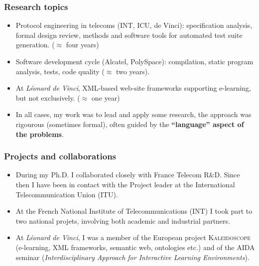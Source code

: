 \documentclass[compress,dvips,xcolor={dvipsnames},t]{beamer}
\begin{document}
%
\begin{frame}
\frametitle{Research topics}

\begin{itemize}

  \item Protocol engineering in telecoms (INT, ICU, de Vinci):
  specification analysis, formal design review, methods and software
  tools for automated test suite generation. ($\approx$ four years)

  \item Software development cycle (Alcatel, PolySpace): compilation,
  static program analysis, tests, code quality ($\approx$ two years).

  \item At \emph{Léonard de Vinci}, XML-based web-site frameworks
  supporting e-learning, but not exclusively. ($\approx$ one year)

  \item In all cases, my work was to lead and apply some research, the
  approach was rigourous (sometimes formal), often guided by the
  \textbf{``language'' aspect of the problems}.

\end{itemize}

\end{frame}

%
\begin{frame}
\frametitle{Projects and collaborations}

\begin{itemize}

  \item During my Ph.D. I collaborated closely with France Telecom
  R\&D. Since then I have been in contact with the \ASN Project leader
  at the International Telecommunication Union (ITU).

  \item At the French National Institute of Telecommunications (INT) I
  took part to two national projets, involving both academic and
  industrial partners.

  \item At \emph{Léonard de Vinci}, I was a member of the European
  project \textsc{Kaleidoscope} (e-learning, XML frameworks, semantic
  web, ontologies etc.) and of the AIDA seminar
  (\emph{Interdisciplinary Approach for Interactive Learning
  Environments}).

\end{itemize}

\end{frame}
\end{document}
